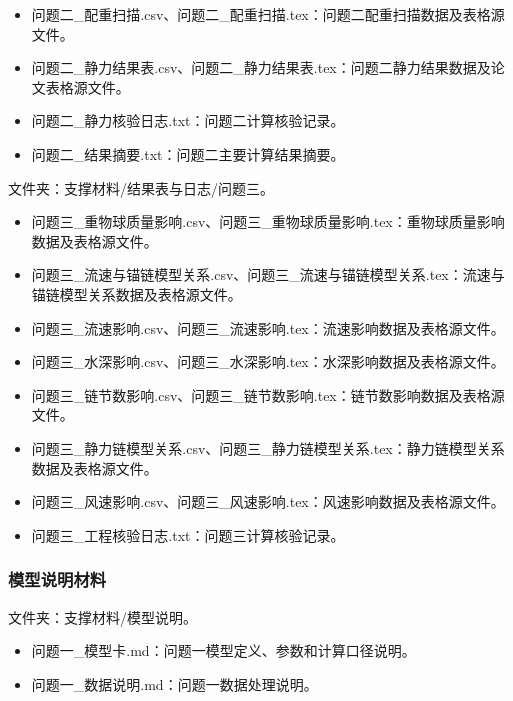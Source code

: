 \begin{itemize}
  \item 问题二\_配重扫描.csv、问题二\_配重扫描.tex：问题二配重扫描数据及表格源文件。
  \item 问题二\_静力结果表.csv、问题二\_静力结果表.tex：问题二静力结果数据及论文表格源文件。
  \item 问题二\_静力核验日志.txt：问题二计算核验记录。
  \item 问题二\_结果摘要.txt：问题二主要计算结果摘要。
\end{itemize}

文件夹：支撑材料/结果表与日志/问题三。

\begin{itemize}
  \item 问题三\_重物球质量影响.csv、问题三\_重物球质量影响.tex：重物球质量影响数据及表格源文件。
  \item 问题三\_流速与锚链模型关系.csv、问题三\_流速与锚链模型关系.tex：流速与锚链模型关系数据及表格源文件。
  \item 问题三\_流速影响.csv、问题三\_流速影响.tex：流速影响数据及表格源文件。
  \item 问题三\_水深影响.csv、问题三\_水深影响.tex：水深影响数据及表格源文件。
  \item 问题三\_链节数影响.csv、问题三\_链节数影响.tex：链节数影响数据及表格源文件。
  \item 问题三\_静力链模型关系.csv、问题三\_静力链模型关系.tex：静力链模型关系数据及表格源文件。
  \item 问题三\_风速影响.csv、问题三\_风速影响.tex：风速影响数据及表格源文件。
  \item 问题三\_工程核验日志.txt：问题三计算核验记录。
\end{itemize}

\subsubsection{模型说明材料}

文件夹：支撑材料/模型说明。

\begin{itemize}
  \item 问题一\_模型卡.md：问题一模型定义、参数和计算口径说明。
  \item 问题一\_数据说明.md：问题一数据处理说明。
\end{itemize}
